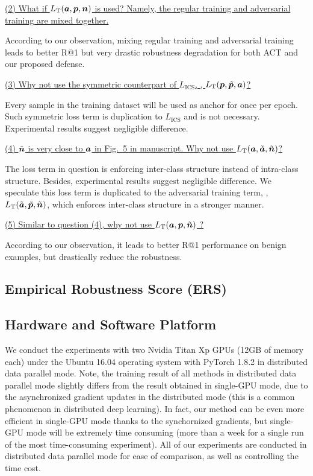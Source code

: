 \ul{(2) What if $L_\text{T}({\bm{a}}, {\bm{p}}, {\bm{n}})$ is used? Namely, the regular training
and adversarial training are mixed together.}

According to our observation, mixing regular training and adversarial training
leads to better R@1 but very drastic robustness degradation for both ACT and
our proposed defense.

\ul{(3) Why not use the symmetric counterpart of $L_\text{ICS}$, \ie,
		$L_\text{T}({\bm{p}}, \tilde{{\bm{p}}}, {\bm{a}})$?}

Every sample in the training dataset will be used as anchor for once per
epoch.
%
Such symmetric loss term is duplication to $L_\text{ICS}$ and is
not necessary.
%
Experimental results suggest negligible difference.

\ul{(4) $\tilde{{\bm{n}}}$ is very close to ${\bm{a}}$ in Fig.~5 in manuscript.
Why not use $L_\text{T}({\bm{a}}, \tilde{{\bm{a}}}, \tilde{{\bm{n}}})$?}

The loss term in question is enforcing inter-class structure instead of
intra-class structure.
%
Besides, experimental results suggest negligible difference.
%
We speculate this loss term is duplicated to the adversarial training term,
\ie, $L_\text{T}(\tilde{{\bm{a}}}, \tilde{{\bm{p}}}, \tilde{{\bm{n}}})$, which enforces
inter-class structure in a stronger manner.

\ul{(5) Similar to question (4), why not use $L_\text{T}({\bm{a}}, {\bm{p}}, \tilde{{\bm{n}}})$ ?}

According to our observation, it leads to better R@1 performance on benign
examples, but drastically reduce the robustness.

\subsection{Empirical Robustness Score (ERS)}


\subsection{Hardware and Software Platform}

We conduct the experiments with two Nvidia Titan Xp GPUs (12GB of memory each)
under the Ubuntu 16.04 operating system with PyTorch 1.8.2 in distributed data
parallel mode.
%
Note, the training result of all methods in distributed data parallel mode
slightly differs from the result obtained in single-GPU mode, due to the
asynchronized gradient updates in the distributed mode (this is a common
phenomenon in distributed deep learning).
%
In fact, our method can be even more efficient in single-GPU mode thanks to the
synchornized gradients, but single-GPU mode will be extremely time consuming
(more than a week for a single run of the most time-consuming experiment).
%
All of our experiments are conducted in distributed data parallel mode for ease
of comparison, as well as controlling the time cost.


